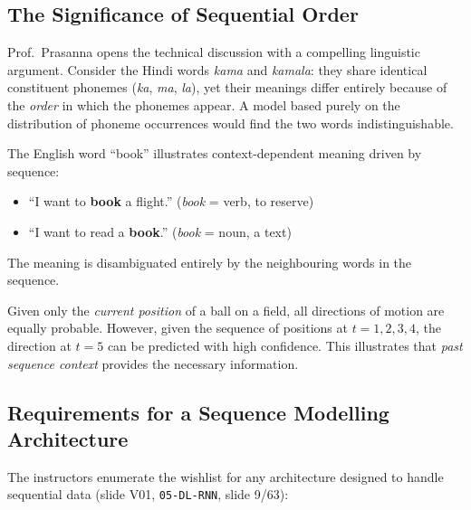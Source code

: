 \documentclass[12pt,a4paper]{article}
\begin{document}
\subsection{The Significance of Sequential Order}
\label{subsec:order_significance}

Prof.\ Prasanna opens the technical discussion with a compelling linguistic
argument.  Consider the Hindi words \emph{kama} and \emph{kamala}: they
share identical constituent phonemes (\emph{ka}, \emph{ma}, \emph{la}), yet
their meanings differ entirely because of the \emph{order} in which the
phonemes appear.  A model based purely on the distribution of phoneme
occurrences would find the two words indistinguishable.

\begin{example}
The English word ``book'' illustrates context-dependent meaning driven by
sequence:
\begin{itemize}[nosep]
  \item ``I want to \textbf{book} a flight.'' \quad (\textit{book} = verb,
        to reserve)
  \item ``I want to read a \textbf{book}.'' \quad (\textit{book} = noun,
        a text)
\end{itemize}
The meaning is disambiguated entirely by the neighbouring words in the
sequence.
\end{example}

\begin{example}[title={Ball Trajectory Prediction}]
Given only the \emph{current position} of a ball on a field, all directions
of motion are equally probable.  However, given the sequence of positions
at $t{=}1,2,3,4$, the direction at $t{=}5$ can be predicted with high
confidence.  This illustrates that \emph{past sequence context} provides
the necessary information.
\end{example}

\subsection{Requirements for a Sequence Modelling Architecture}
\label{subsec:requirements}

The instructors enumerate the wishlist for any architecture designed to
handle sequential data (slide V01, \texttt{05-DL-RNN}, slide 9/63):
\end{document}
